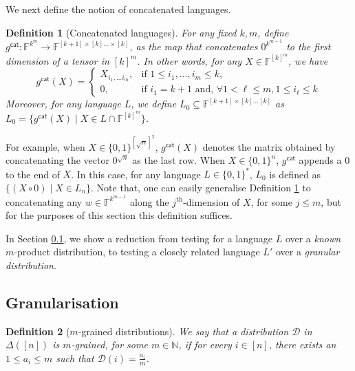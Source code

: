 \documentclass[11pt]{article}
\newtheorem{definition}{Definition}[section]
\newcommand{\F}{\mathbb{F}}
\newcommand{\N}{\mathbb{N}}
\begin{document}
\noindent We next define the notion of concatenated languages.
\begin{definition}[Concatenated languages]
    \label{def:concat_lang}
     For any fixed $k, m$, define $g^{\mathsf{cat}} : \F^{k^m} \rightarrow \F^{[k+1] \times [k] \dots \times [k]}$, as the map that concatenates $0^{k^{m-1}}$ to the first dimension of a tensor in $[k]^m$. In other words, for any $X \in \F^{[k]^m}$, we have
        \begin{equation*}
        g^{\mathsf{cat}} (X) = 
        \begin{cases}
        X_{i_1, \dots i_m}, & \text{if } 1 \leq i_1, \dots, i_m \leq k, \\
        0, & \text{if } i_1 = k+1 \text{ and, } \forall 1 < \ell \leq m, 1 \leq i_\ell \leq k
        \end{cases}
    \end{equation*}
    Moreover, for any language $L$, we define $L_0 \subseteq \F^{[k+1] \times [k] \dots [k]}$ as $L_0 = \{ g^{\mathsf{cat}}(X) \mid X \in L \cap \F^{[k]^m} \}$.
\end{definition}

\vspace{0.05in}
For example, when $X \in \{0,1\}^{[\sqrt{n}]^2}$, $g^{\mathsf{cat}}(X)$ denotes the matrix obtained by concatenating the vector $0^{\sqrt{n}}$ as the last row. When $X \in \{0,1\}^n$, $g^{\mathsf{cat}}$ appends a $0$ to the end of $X$. In this case, for any language $L \in \{0,1\}^*$, $L_0$ is defined as $\{(X \circ 0) \mid X \in L_n \}$. Note that, one can easily generalise Definition \ref{def:concat_lang} to concatenating any $w \in \F^{k^{m-1}}$ along the $j^{\text{th}}$-dimension of $X$, for some $j \leq m$, but for the purposes of this section this definition suffices.

In Section \ref{sec:gran}, we show a reduction from testing for a language $L$ over a \textit{known} $m$-product distribution, to testing a closely related language $L'$ over a \textit{granular distribution}.

\subsection{Granularisation}
\label{sec:gran}

\begin{definition}[$m$-grained distributions]
    We say that a distribution $\mathcal{D}$ in $\Delta([n])$ is $m$-grained, for some $m \in \N$, if for every $i\in [n]$, there exists an $1 \leq a_{i} \leq m$ such that $\mathcal{D}(i)=\frac{a_{i}}{m}$. 
\end{definition}
\end{document}
